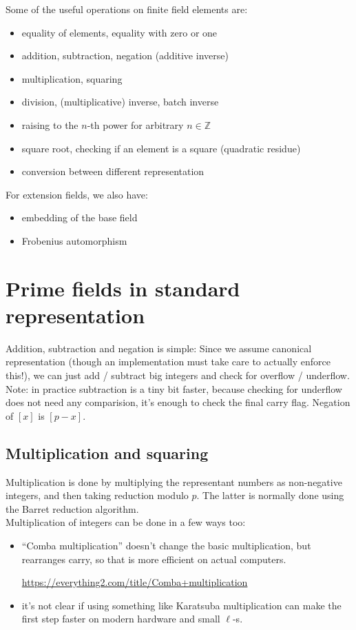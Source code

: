 \documentclass[12pt,draft,a4paper,openany,oneside]{amsbook}
\def\Z{\mathbb{Z}}
\theoremstyle{plain}
\theoremstyle{definition}
\begin{document}
Some of the useful operations on finite field elements are:
\begin{itemize}
\item equality of elements, equality with zero or one
\item addition, subtraction, negation (additive inverse)
\item multiplication, squaring
\item division, (multiplicative) inverse, batch inverse
\item raising to the $n$-th power for arbitrary $n\in\Z$
\item square root, checking if an element is a square (quadratic residue)
\item conversion between different representation\\
\end{itemize}

For extension fields, we also have:
\begin{itemize}
\item embedding of the base field
\item Frobenius automorphism
\end{itemize}


\section{Prime fields in standard representation}

Addition, subtraction and negation is simple: Since we assume canonical representation
(though an implementation must take care to actually enforce this!), we can
just add / subtract big integers and check for overflow / underflow. Note:
in practice subtraction is a tiny bit faster, because checking for underflow
does not need any comparision, it's enough to check the final carry flag.
Negation of $[x]$ is $[p-x]$.

\subsection{Multiplication and squaring}
Multiplication is done by multiplying the representant numbers as non-negative 
integers, and then taking reduction modulo $p$.
The latter is normally done using the Barret reduction algorithm.\\

Multiplication of integers can be done in a few ways too:
\begin{itemize}
\item ``Comba multiplication'' doesn't change the basic multiplication, but
rearranges carry, so that is more efficient on actual computers.

\url{https://everything2.com/title/Comba+multiplication}
\item it's not clear if using something like Karatsuba multiplication can make
the first step faster on modern hardware and small $\ell$-s.\\
\end{itemize}
\end{document}
